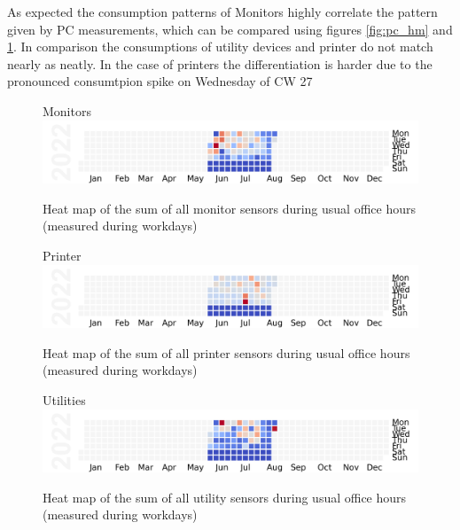As expected the consumption patterns of Monitors highly correlate the pattern given by PC measurements, which can be compared using figures \ref{fig:pc_hm} and \ref{fig:mon_hm}. In comparison the consumptions of utility devices and printer do not match nearly as neatly. In the case of printers the differentiation is harder due to the pronounced consumtpion spike on Wednesday of CW 27
\begin{figure}[ht]
	\centering
	Monitors
	\includegraphics[width=\textwidth]{images/heatmaps/devicetype_Monitor_workday_cal.png}
	\caption{Heat map of the sum of all monitor sensors during usual office hours (measured during \glspl{workday})}
	\label{fig:mon_hm}
\end{figure}
\begin{figure}[ht]
	\centering
	Printer
	\includegraphics[width=\textwidth]{images/heatmaps/devicetype_Printer_workday_cal.png}
	\caption{Heat map of the sum of all printer sensors during usual office hours (measured during \glspl{workday})}
	\label{fig:printer_hm}
\end{figure}

\begin{figure}[ht]
	\centering
	Utilities	\includegraphics[width=\textwidth]{images/heatmaps/devicetype_Utility_workday_cal.png}
	\caption{Heat map of the sum of all utility sensors during usual office hours (measured during \glspl{workday})}
	\label{fig:util_hm}
\end{figure}

